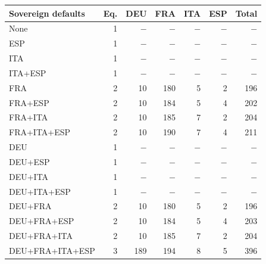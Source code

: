\begin{tabular*}{\textwidth}{@{\extracolsep{\fill}}lrrrrrr@{}}
\toprule
Sovereign defaults & Eq. & DEU & FRA & ITA & ESP & Total \\
\midrule
None & 1 & $-$ & $-$ & $-$ & $-$ & $-$ \\
ESP & 1 & $-$ & $-$ & $-$ & $-$ & $-$ \\
ITA & 1 & $-$ & $-$ & $-$ & $-$ & $-$ \\
ITA+ESP & 1 & $-$ & $-$ & $-$ & $-$ & $-$ \\
FRA & 2 & 10 & 180 & 5 & 2 & 196 \\
FRA+ESP & 2 & 10 & 184 & 5 & 4 & 202 \\
FRA+ITA & 2 & 10 & 185 & 7 & 2 & 204 \\
FRA+ITA+ESP & 2 & 10 & 190 & 7 & 4 & 211 \\
DEU & 1 & $-$ & $-$ & $-$ & $-$ & $-$ \\
DEU+ESP & 1 & $-$ & $-$ & $-$ & $-$ & $-$ \\
DEU+ITA & 1 & $-$ & $-$ & $-$ & $-$ & $-$ \\
DEU+ITA+ESP & 1 & $-$ & $-$ & $-$ & $-$ & $-$ \\
DEU+FRA & 2 & 10 & 180 & 5 & 2 & 196 \\
DEU+FRA+ESP & 2 & 10 & 184 & 5 & 4 & 203 \\
DEU+FRA+ITA & 2 & 10 & 185 & 7 & 2 & 204 \\
DEU+FRA+ITA+ESP & 3 & 189 & 194 & 8 & 5 & 396 \\
\bottomrule
\end{tabular*}
